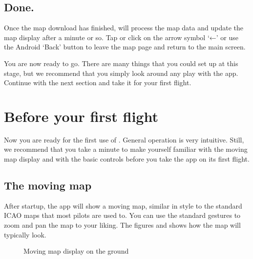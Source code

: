 \documentclass[letterpaper,10pt,english]{sphinxmanual}
\begin{document}
\section{Done.}
\label{\detokenize{01-intro/02-installation:done}}
\sphinxAtStartPar
Once the map download has finished,  will process
the map data and update the map display after a minute or so.  Tap or click on
the arrow symbol ‘←’ or use the Android ‘Back’ button to leave the map page and
return to the main screen.

\sphinxAtStartPar
You are now ready to go.  There are many things that you could set up at this
stage, but we recommend that you simply look around any play with the app.
Continue with the next section and take it for your first flight.


\chapter{Before your first flight}
\label{\detokenize{01-intro/03-firstFlight:before-your-first-flight}}\label{\detokenize{01-intro/03-firstFlight::doc}}
\sphinxAtStartPar
Now you are ready for the first use of .  General
operation is very intuitive.  Still, we recommend that you take a minute to make
yourself familiar with the moving map display and with the basic controls before
you take the app on its first flight.


\section{The moving map}
\label{\detokenize{01-intro/03-firstFlight:the-moving-map}}
\sphinxAtStartPar
After startup, the app will show a moving map, similar in style to the standard
ICAO maps that most pilots are used to.  You can use the standard gestures to
zoom and pan the map to your liking.  The figures {\hyperref[\detokenize{01-intro/03-firstFlight:movingmapground}]{}} and
{\hyperref[\detokenize{01-intro/03-firstFlight:movingmapflight}]{}} shows how the map will typically look.

\begin{figure}[htbp]
\centering
\capstart

\noindent{}
\caption{Moving map display on the ground}\label{\detokenize{01-intro/03-firstFlight:id1}}\label{\detokenize{01-intro/03-firstFlight:movingmapground}}\end{figure}
\end{document}
